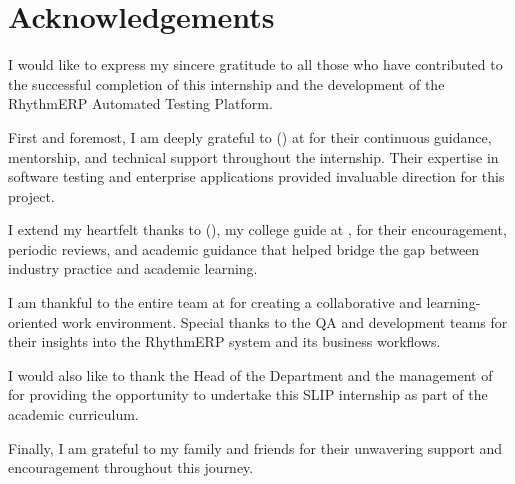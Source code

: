 \chapter*{Acknowledgements}

I would like to express my sincere gratitude to all those who have contributed to the successful completion of this internship and the development of the RhythmERP Automated Testing Platform.

\vspace{0.5cm}

\noindent
First and foremost, I am deeply grateful to \textbf{\companyMentor}
(\mentorDesignation) at \companyName{} for their continuous guidance, mentorship, and
technical support throughout the internship. Their expertise in software testing and
enterprise applications provided invaluable direction for this project.

\vspace{0.5cm}

\noindent
I extend my heartfelt thanks to \textbf{\internshipGuide} (\guideDesignation),
my college guide at \collegeName{}, for their encouragement, periodic reviews, and
academic guidance that helped bridge the gap between industry practice and academic
learning.

\vspace{0.5cm}

\noindent
I am thankful to the entire team at \companyName{} for creating a collaborative and
learning-oriented work environment. Special thanks to the QA and development teams for
their insights into the RhythmERP system and its business workflows.

\vspace{0.5cm}

\noindent
I would also like to thank the Head of the Department and the management of \collegeName{}
for providing the opportunity to undertake this SLIP internship as part of the academic
curriculum.

\vspace{0.5cm}

\noindent
Finally, I am grateful to my family and friends for their unwavering support and
encouragement throughout this journey.

\newpage
